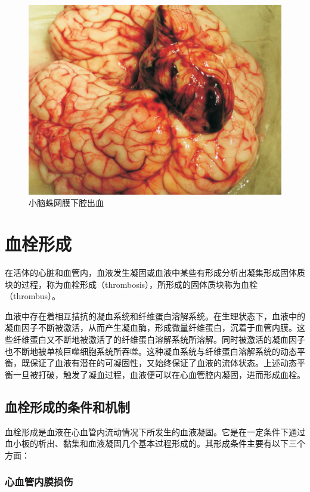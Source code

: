 \begin{figure}[!htbp]
  \centering
  \includegraphics{./images/Image00037.jpg}
  \caption{小脑蛛网膜下腔出血}
  \label{fig3-4}
\end{figure}


\section{血栓形成}

在活体的心脏和血管内，血液发生凝固或血液中某些有形成分析出凝集形成固体质块的过程，称为血栓形成（thrombosis），所形成的固体质块称为血栓（thrombus）。

血液中存在着相互拮抗的凝血系统和纤维蛋白溶解系统。在生理状态下，血液中的凝血因子不断被激活，从而产生凝血酶，形成微量纤维蛋白，沉着于血管内膜。这些纤维蛋白又不断地被激活了的纤维蛋白溶解系统所溶解。同时被激活的凝血因子也不断地被单核巨噬细胞系统所吞噬。这种凝血系统与纤维蛋白溶解系统的动态平衡，既保证了血液有潜在的可凝固性，又始终保证了血液的流体状态。上述动态平衡一旦被打破，触发了凝血过程，血液便可以在心血管腔内凝固，进而形成血栓。

\subsection{血栓形成的条件和机制}

血栓形成是血液在心血管内流动情况下所发生的血液凝固。它是在一定条件下通过血小板的析出、黏集和血液凝固几个基本过程形成的。其形成条件主要有以下三个方面：

\subsubsection{心血管内膜损伤}

